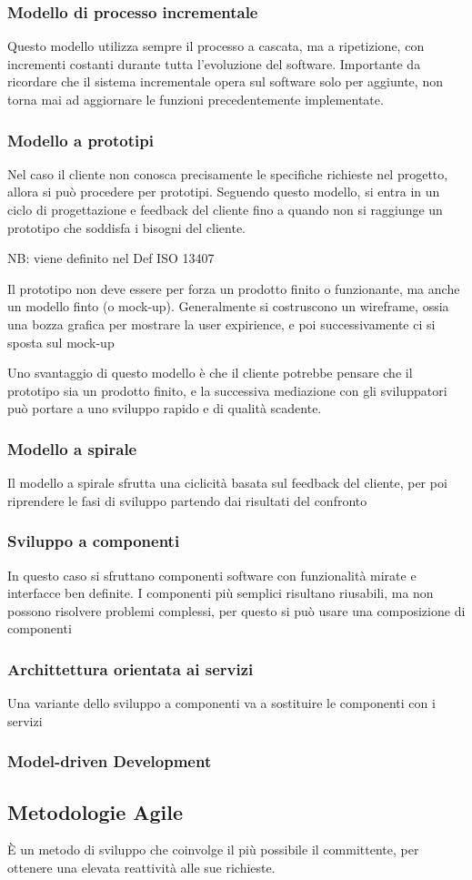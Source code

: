 \documentclass[12pt, a4paper]{article}
\begin{document}
\subsubsection{Modello di processo incrementale}
Questo modello utilizza sempre il processo a cascata, ma a ripetizione, con incrementi costanti durante tutta
l'evoluzione del software. Importante da ricordare che il sistema incrementale opera sul software solo per aggiunte,
non torna mai ad aggiornare le funzioni precedentemente implementate.

\subsubsection{Modello a prototipi}
Nel caso il cliente non conosca precisamente le specifiche richieste nel progetto, allora si può procedere per 
prototipi. Seguendo questo modello, si entra in un ciclo di progettazione e feedback del cliente fino a quando non 
si raggiunge un prototipo che soddisfa i bisogni del cliente.

NB: viene definito nel Def ISO 13407

Il prototipo non deve essere per forza un prodotto finito o funzionante, ma anche un modello finto (o mock-up).
Generalmente si costruscono un wireframe, ossia una bozza grafica per mostrare la user expirience, e poi 
successivamente ci si sposta sul mock-up

Uno svantaggio di questo modello è che il cliente potrebbe pensare che il prototipo sia un prodotto finito, 
e la successiva mediazione con gli sviluppatori può portare a uno sviluppo rapido e di qualità scadente.

\subsubsection{Modello a spirale}
Il modello a spirale sfrutta una ciclicità basata sul feedback del cliente, per poi riprendere le fasi di
sviluppo partendo dai risultati del confronto

\subsubsection{Sviluppo a componenti}
In questo caso si sfruttano componenti software con funzionalità mirate e interfacce ben definite.
I componenti più semplici risultano riusabili, ma non possono risolvere problemi complessi, per questo si può usare
una composizione di componenti

\subsubsection{Archittettura orientata ai servizi}
Una variante dello sviluppo a componenti va a sostituire le componenti con i servizi

\subsubsection{Model-driven Development}

\subsection{Metodologie Agile}
È un metodo di sviluppo che coinvolge il più possibile il committente, per ottenere una elevata reattività alle
sue richieste.
\end{document}
